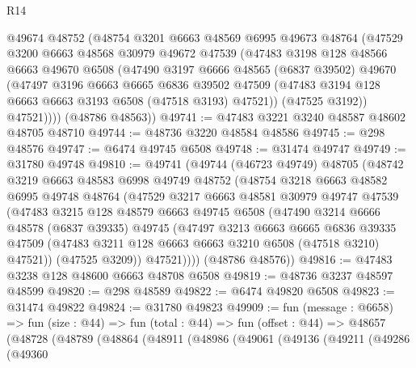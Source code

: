 \begin{lexlean}{R14}
\begin{coremodule}
        @49674
        @48752
        (@48754
          @3201
          @6663
          @48569
          @6995
          @49673
          @48764
          (@47529
            @3200
            @6663
            @48568
            @30979
            @49672
            @47539
            (@47483
              @3198
              @128
              @48566
              @6663
              @49670
              @6508
              (@47490
                @3197
                @6666
                @48565
                (@6837 @39502)
                @49670
                (@47497
                  @3196
                  @6663
                  @6665
                  @6836
                  @39502
                  @47509
                  (@47483 @3194 @128 @6663 @6663 @3193 @6508 (@47518 @3193) @47521))
                (@47525 @3192))
              @47521))))
      (@48786 @48563))
@49741 := @47483 @3221 @3240 @48587 @48602 @48705 @48710
@49744 := @48736 @3220 @48584 @48586
@49745 := @298 @48576
@49747 := @6474 @49745 @6508
@49748 := @31474 @49747
@49749 := @31780 @49748
@49810 := @49741
    (@49744
      (@46723 @49749)
      @48705
      (@48742
        @3219
        @6663
        @48583
        @6998
        @49749
        @48752
        (@48754
          @3218
          @6663
          @48582
          @6995
          @49748
          @48764
          (@47529
            @3217
            @6663
            @48581
            @30979
            @49747
            @47539
            (@47483
              @3215
              @128
              @48579
              @6663
              @49745
              @6508
              (@47490
                @3214
                @6666
                @48578
                (@6837 @39335)
                @49745
                (@47497
                  @3213
                  @6663
                  @6665
                  @6836
                  @39335
                  @47509
                  (@47483 @3211 @128 @6663 @6663 @3210 @6508 (@47518 @3210) @47521))
                (@47525 @3209))
              @47521))))
      (@48786 @48576))
@49816 := @47483 @3238 @128 @48600 @6663 @48708 @6508
@49819 := @48736 @3237 @48597 @48599
@49820 := @298 @48589
@49822 := @6474 @49820 @6508
@49823 := @31474 @49822
@49824 := @31780 @49823
@49909 := fun (message : @6658) =>
  fun (size : @44) =>
  fun (total : @44) =>
  fun (offset : @44) =>
  @48657
    (@48728
      (@48789
        (@48864
          (@48911
            (@48986
              (@49061
                (@49136
                  (@49211
                    (@49286
                      (@49360

\end{coremodule}
\end{lexlean}
